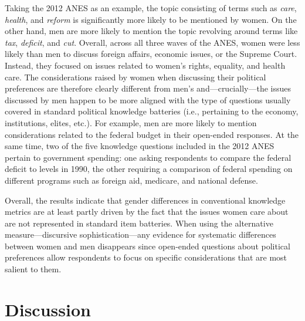 Taking the 2012 ANES as an example, the topic consisting of terms such as \textit{care}, \textit{health}, and \textit{reform} is significantly more likely to be mentioned by women. On the other hand, men are more likely to mention the topic revolving around terms like \textit{tax}, \textit{deficit}, and \textit{cut}. Overall, across all three waves of the ANES, women were less likely than men to discuss foreign affairs, economic issues, or the Supreme Court. Instead, they focused on issues related to women's rights, equality, and health care. The considerations raised by women when discussing their political preferences are therefore clearly different from men's and---crucially---the issues discussed by men happen to be more aligned with the type of questions usually covered in standard political knowledge batteries (i.e., pertaining to the economy, institutions, elites, etc.). For example, men are more likely to mention considerations related to the federal budget in their open-ended responses. At the same time, two of the five knowledge questions included in the 2012 ANES pertain to government spending: one asking respondents to compare the federal deficit to levels in 1990, the other requiring a comparison of federal spending on different programs such as foreign aid, medicare, and national defense.

Overall, the results indicate that gender differences in conventional knowledge metrics are at least partly driven by the fact that the issues women care about are not represented in standard item batteries. When using the alternative measure---discursive sophistication---any evidence for systematic differences between women and men disappears since open-ended questions about political preferences allow respondents to focus on specific considerations that are most salient to them. 



\section*{Discussion}

